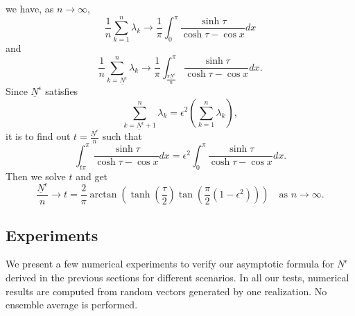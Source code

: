 \documentclass[11pt]{amsart}
\begin{document}
we have, as $n \rightarrow \infty$,
\begin{equation}
\frac{1}{n}\sum_{k=1}^{n} \lambda_k\rightarrow \frac{1}{\pi} \int_{0}^{\pi}\frac{\sinh \tau}{\cosh\tau - \cos x} dx 
\end{equation}
and 
\begin{equation}
\frac{1}{n}\sum_{k=\underline{N}^{\epsilon}}^{n} \lambda_k\rightarrow \frac{1}{\pi} \int_{\frac{\pi\underline{N}^{\epsilon}}{n}}^{\pi}\frac{\sinh \tau}{\cosh\tau - \cos x} dx.
\end{equation}
Since $\underline{N}^{\epsilon}$ satisfies 
	\begin{equation}
	\sum_{k=\underline{N}^{\epsilon}+1}^{n} \lambda_k	=  \epsilon^2\left(\sum_{k=1}^{n} \lambda_k \right),
	\end{equation}
	it is to find out $t = \frac{\underline{N}^{\epsilon}}{n}$ such that
	\begin{equation}
	\int_{t\pi}^{\pi}\frac{\sinh \tau}{\cosh\tau - \cos x} dx = \epsilon^2 	\int_{0}^{\pi}\frac{\sinh \tau}{\cosh\tau - \cos x} dx.
	\end{equation}
	Then we solve $t$ and get
	\begin{equation}
	\label{eq:t}
	 \frac{\underline{N}^{\epsilon}}{n} \rightarrow t = \frac{2}{\pi} \arctan\left(\tanh\left(\frac{\tau}{2}\right) \tan\left(\frac{\pi}{2}(1 - \epsilon^2)\right)\right) \quad \mbox{as } n\rightarrow \infty.
	\end{equation}


\subsection{Experiments} 
We present a few numerical experiments to verify our asymptotic formula for $\underline{N}^{\epsilon}$ derived in the previous sections for different scenarios. In all our tests, numerical results are computed from random vectors generated by one realization. No ensemble average is performed.
\end{document}
